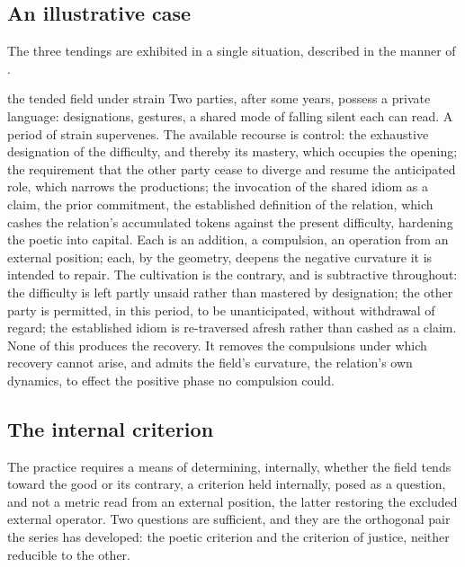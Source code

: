 \subsection{An illustrative case}
\label{p10:sec:concrete-field}

The three tendings are exhibited in a single situation, described in the manner of .

\begin{casebox}{the tended field under strain}
Two parties, after some years, possess a private language: designations, gestures, a shared mode of falling silent each can read. A period of strain supervenes. The available recourse is control: the exhaustive designation of the difficulty, and thereby its mastery, which occupies the opening; the requirement that the other party cease to diverge and resume the anticipated role, which narrows the productions; the invocation of the shared idiom as a claim, the prior commitment, the established definition of the relation, which cashes the relation's accumulated tokens against the present difficulty, hardening the poetic into capital. Each is an addition, a compulsion, an operation from an external position; each, by the geometry, deepens the negative curvature it is intended to repair. The cultivation is the contrary, and is subtractive throughout: the difficulty is left partly unsaid rather than mastered by designation; the other party is permitted, in this period, to be unanticipated, without withdrawal of regard; the established idiom is re-traversed afresh rather than cashed as a claim. None of this produces the recovery. It removes the compulsions under which recovery cannot arise, and admits the field's curvature, the relation's own dynamics, to effect the positive phase no compulsion could.
\end{casebox}

\subsection{The internal criterion}
\label{p10:sec:criterion}

The practice requires a means of determining, internally, whether the field tends toward the good or its contrary, a criterion held internally, posed as a question, and not a metric read from an external position, the latter restoring the excluded external operator. Two questions are sufficient, and they are the orthogonal pair the series has developed: the poetic criterion and the criterion of justice, neither reducible to the other.

